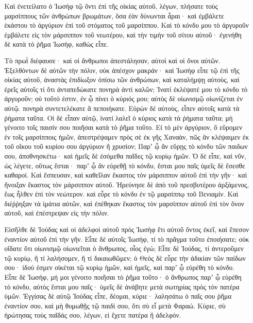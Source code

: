 {Καὶ ἐνετείλατο ὁ Ἰωσὴφ τῷ ὄντι ἐπὶ τῆς οἰκίας αὐτοῦ, λέγων, πλήσατε τοὺς μαρσίππους τῶν ἀνθρώπων βρωμάτων, ὅσα ἐὰν δύνωνται ἆραι· καὶ ἐμβάλετε ἑκάστου τὸ ἀργύριον ἐπὶ τοῦ στόματος τοῦ μαρσίππου.
Καὶ τὸ κόνδυ μου τὸ ἀργυροῦν ἐμβάλετε εἰς τὸν μάρσιππον τοῦ νεωτέρου, καὶ τὴν τιμὴν τοῦ σίτου αὐτοῦ· ἐγενήθη δὲ κατὰ τὸ ῥῆμα Ἰωσὴφ, καθὼς εἶπε.
\par }{\PP {}Τὸ πρωῒ διέφαυσε· καὶ οἱ ἄνθρωποι ἀπεστάλησαν, αὐτοὶ καὶ οἱ ὄνοι αὐτῶν.
Ἐξελθόντων δὲ αὐτῶν τὴν πόλιν, οὐκ ἀπέσχον μακράν· καὶ Ἰωσὴφ εἶπε τῷ ἐπὶ τῆς οἰκίας αὐτοῦ, ἀναστὰς ἐπιδίωξον ὀπίσω τῶν ἀνθρώπων, καὶ καταλήμψῃ αὐτοὺς, καὶ ἐρεῖς αὐτοῖς τί ὅτι ἀνταπεδώκατε πονηρὰ ἀντὶ καλῶν;
Ἱνατί ἐκλέψατέ μου τὸ κόνδυ τὸ ἀργυροῦν; οὐ τοῦτό ἐστιν, ἐν ᾧ πίνει ὁ κύριός μου; αὐτὸς δὲ οἰωνισμῷ οἰωνίζεται ἐν αὐτῷ. πονηρὰ συντετελέκατε ἃ πεποιήκατε.
Εὑρὼν δὲ αὐτοὺς, εἶπεν αὐτοῖς κατὰ τὰ ῥήματα ταῦτα.
Οἱ δὲ εἶπαν αὐτῷ, ἱνατί λαλεῖ ὁ κύριος κατὰ τὰ ῥήματα ταῦτα; μὴ γένοιτο τοῖς παισίν σου ποιῆσαι κατὰ τὸ ῥῆμα τοῦτο.
Εἰ τὸ μὲν ἀργύριον, ὃ εὕρομεν ἐν τοῖς μαρσίπποις ἡμῶν, ἀπεστρέψαμεν πρὸς σὲ ἐκ γῆς Χαναὰν, πῶς ἂν κλέψαιμεν ἐκ τοῦ οἴκου τοῦ κυρίου σου ἀργύριον ἢ χρυσίον;
Παρʼ ᾧ ἂν εὕρῃς τὸ κόνδυ τῶν παιδων σου, ἀποθνησκέτω· καὶ ἡμεῖς δὲ ἐσόμεθα παῖδες τῷ κυρίῳ ἡμῶν.
Ὁ δὲ εἶπε, καὶ νῦν, ὡς λέγετε, οὕτως ἔσται· παρʼ ᾧ ἂν εὑρεθῇ τὸ κόνδυ, ἔσται μου παῖς ὑμεῖς δὲ ἔσεσθε καθαροί.
Καὶ ἔσπευσαν, καὶ καθεῖλαν ἕκαστος τὸν μάρσιππον αὐτοῦ ἐπὶ τὴν γῆν· καὶ ἤνοιξαν ἕκαστος τὸν μάρσιππον αὐτοῦ.
Ἠρεύνησε δὲ ἀπὸ τοῦ πρεσβυτέρου ἀρξάμενος, ἕως ἦλθεν ἐπὶ τὸν νεώτερον. καὶ εὗρε τὸ κόνδυ ἐν τῷ μαρσίππῳ τοῦ Βενιαμίν.
Καὶ διέῤῥηξαν τὰ ἱμάτια αὐτῶν, καὶ ἐπέθηκαν ἕκαστος τὸν μαρσίππον αὐτοῦ ἐπὶ τὸν ὄνον αὐτοῦ, καὶ ἐπέστρεψαν εἰς τὴν πόλιν.
\par }{\PP {}Εἰσῆλθε δὲ Ἰούδας καὶ οἱ ἀδελφοὶ αὐτοῦ πρὸς Ἰωσὴφ ἔτι αὐτοῦ ὄντος ἐκεῖ, καὶ ἔπεσον ἐναντίον αὐτοῦ ἐπὶ τὴν γῆν.
Εἶπε δὲ αὐτοῖς Ἰωσὴφ, τί τὸ πρᾶγμα τοῦτο ἐποιήσατε; οὐκ οἴδατε ὅτι οἰωνισμῷ οἰωνιεῖται ὁ ἄνθρωπος, οἷος ἐγώ;
Εἶπε δὲ Ἰούδας, τί ἀντεροῦμεν τῷ κυρίῳ, ἢ τί λαλήσομεν, ἢ τί δικαιωθῶμεν; ὁ Θεὸς δὲ εὗρε τὴν ἀδικίαν τῶν παίδων σου· ἰδού ἐσμεν οἰκέται τῷ κυρίῳ ἡμῶν, καὶ ἡμεῖς, καὶ παρʼ ᾧ εὑρέθη τὸ κόνδυ.
Εἶπε δὲ Ἰωσὴφ, μή μοι γένοιτο ποιῆσαι τὸ ῥῆμα τοῦτο· ὁ ἄνθρωπος παρʼ ᾧ εὑρέθη τὸ κόνδυ, αὐτὸς ἔσται μου παῖς· ὑμεῖς δὲ ἀνάβητε μετὰ σωτηρίας πρὸς τὸν πατέρα ὑμῶν.
Ἐγγίσας δὲ αὐτῷ Ἰούδας εἶπε, δέομαι, κύριε· λαλησάτω ὁ παῖς σου ῥῆμα ἐναντίον σου, καὶ μὴ θυμωθῇς τῷ παιδί σου, ὅτι σὺ εἶ μετὰ Φαραώ.
Κύριε, σὺ ἠρώτησας τοὺς παῖδάς σου, λέγων, εἰ ἔχετε πατέρα ἢ ἀδελφόν.
}
